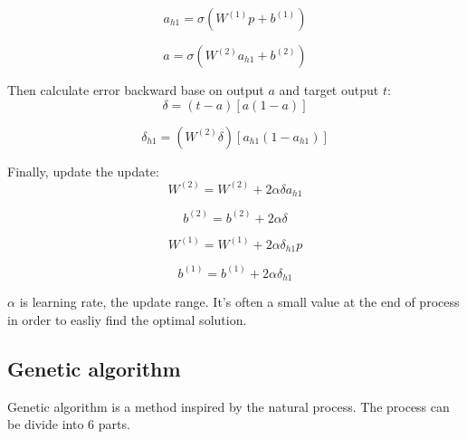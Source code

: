 \documentclass[conference]{IEEEtran}
\begin{document}
\begin{equation}
\label{hidden_layer_output}
a_{h1}=\sigma(W^{(1)}p+b^{(1)})
\end{equation}

\begin{equation}
\label{output_layer_output}
a=\sigma(W^{(2)}a_{h1}+b^{(2)})
\end{equation}

Then calculate error backward base on output $a$ and target output $t$:\\

\begin{equation}
\label{output_layer_error}
\delta=(t-a)[a(1-a)]
\end{equation}

\begin{equation}
\label{hidden_layer_error}
\delta_{h1}=(W^{(2)}\delta)[a_{h1}(1-a_{h1})]
\end{equation}

Finally, update the update:\\

\begin{equation}
\label{output_layer_update_weight}
W^{(2)}=W^{(2)} + 2\alpha\delta a_{h1}
\end{equation}

\begin{equation}
\label{output_layer_update_bias}
b^{(2)}=b^{(2)} + 2\alpha\delta
\end{equation}

\begin{equation}
\label{hidden_layer_update_weight}
W^{(1)}=W^{(1)} + 2\alpha\delta_{h1}p
\end{equation}

\begin{equation}
\label{hidden_layer_update_bias}
b^{(1)}=b^{(1)} + 2\alpha\delta_{h1}
\end{equation}

$\alpha$ is learning rate, the update range. It's often a small value at the end of process in order to easliy find the optimal solution.\\

\subsection{Genetic algorithm}
Genetic algorithm is a method inspired by the natural process. The process can be divide into 6 parts.\\
\end{document}

